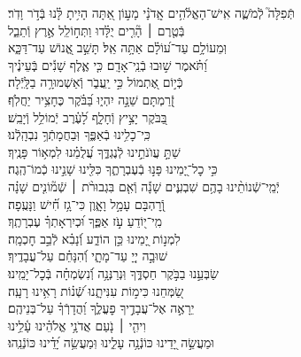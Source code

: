 \documentclass[twoside, openany, parskip=half, 11pt]{book}
\begin{document}
\begin{narrow}
תְּֿפִלָּה֮ לְֿמֹשֶׁ֢ה אִֽישׁ־הָאֱלֹ֫הִ֥ים \hfill \break
אֲֽדֹנָ֗י \hfill מָע֣וֹן אַ֭תָּה הָיִ֥יתָ לָּ֗נוּ בְּֿדֹ֣ר וָדֹֽר׃ \\
בְּֿטֶ֤רֶם ׀ הָ֘רִ֤ים יֻלָּ֗דוּ \hfill וַתְּח֣וֹלֵֽל אֶ֣רֶץ וְֿתֵבֵ֑ל \\ וּֽמֵעוֹלָ֥ם עַד־ע֝וֹלָ֗ם אַתָּ֥ה אֵֽל׃ \hfill
תָּשֵׁ֣ב אֱ֭נוֹשׁ עַד־דַּכָּ֑א\\ וַ֝תֹּ֗אמֶר שׁ֣וּבוּ בְֿנֵֽי־אָדָֽם׃ \hfill
כִּ֤י אֶ֪לֶף שָׁנִ֡ים בְּֽֿעֵינֶ֗יךָ \\ כְּֿי֣וֹם אֶ֭תְמוֹל כִּ֣י יַֽעֲבֹ֑ר \hfill וְֿאַשְׁמוּרָ֥ה בַלָּֽיְֿלָה׃ \\
זְֿ֭רַמְתָּם שֵׁנָ֣ה יִהְי֑וּ \hfill בַּ֝בֹּ֗קֶר כֶּחָצִ֥יר יַחֲלֹֽף׃ \\
בַּ֭בֹּקֶר יָצִ֣יץ וְֿחָלָ֑ף \hfill לָ֝עֶ֗רֶב יְֿמוֹלֵ֥ל וְֿיָבֵֽשׁ׃ \\
כִּֽי־כָלִ֥ינוּ בְֿאַפֶּ֑ךָ \hfill וּֽבַחֲמָתְֿךָ֥ נִבְהָֽלְֿנוּ׃ \\
שַׁתָּ֣ עֲוֺנֹתֵ֣ינוּ לְֿנֶגְדֶּ֑ךָ \hfill עֲ֝לֻמֵ֗נוּ לִמְא֥וֹר פָּנֶֽיךָ׃ \\
כִּ֣י כׇל־יָ֭מֵינוּ פָּנ֣וּ בְֿעֶבְרָתֶ֑ךָ \hfill כִּלִּ֖ינוּ שָׁנֵ֣ינוּ כְֿמוֹ־הֶֽגֶה׃ \\
יְֿמֵֽי־שְֿׁנוֹתֵ֨ינוּ בָהֶ֥ם שִׁבְעִ֪ים שָׁנָ֡ה \hfill וְֿאִ֤ם בִּגְבוּרֹ֨ת ׀ שְֿׁמ֘וֹנִ֤ים שָׁנָ֗ה\\ וְֿ֭רׇהְבָּם עָמָ֣ל וָאָ֑וֶן \hfill כִּי־גָ֥ז חִ֗֝ישׁ וַנָּעֻֽפָה׃ \\
מִֽי־י֭וֹדֵעַ עֹ֣ז אַפֶּ֑ךָ \hfill וּ֝כְיִרְאָתְךָ֗ עֶבְרָתֶֽךָ׃ \\
לִמְנ֣וֹת יָ֭מֵינוּ כֵּ֣ן הוֹדַ֑ע \hfill וְֿ֝נָבִ֗א לְֿבַ֣ב חׇכְמָֽה׃ \\
שׁוּבָ֣ה יְיָ֭ עַד־מָתָ֑י \hfill וְֿ֝הִנָּחֵ֗ם עַל־עֲבָדֶֽיךָ׃ \\
שַׂבְּעֵ֣נוּ בַבֹּ֣קֶר חַסְדֶּ֑ךָ \hfill וּֽנְרַנְּנָ֥ה וְֿ֝נִשְׂמְחָ֗ה בְּֿכׇל־יָמֵֽינוּ׃ \\
שַׂ֭מְּחֵנוּ כִּימ֣וֹת עִנִּיתָ֑נוּ \hfill שְֿׁ֝נ֗וֹת רָאִ֥ינוּ רָעָֽה׃ \\
יֵרָאֶ֣ה אֶל־עֲבָדֶ֣יךָ פׇעֳלֶ֑ךָ \hfill וַ֝הֲדָרְֿךָ֗ עַל־בְּנֵיהֶֽם׃ \\
וִיהִ֤י ׀ נֹ֤עַם אֲדֹנָ֥י אֱלֹהֵ֗ינוּ \hfill עָ֫לֵ֥ינוּ \\ וּמַעֲשֵׂ֣ה יָ֭דֵינוּ כּוֹנְֿנָ֥ה עָלֵ֑ינוּ \hfill וּֽמַעֲשֵׂ֥ה יָ֝דֵ֗ינוּ כּוֹנְֿנֵֽהוּ׃ \\



\end{narrow}
\end{document}
